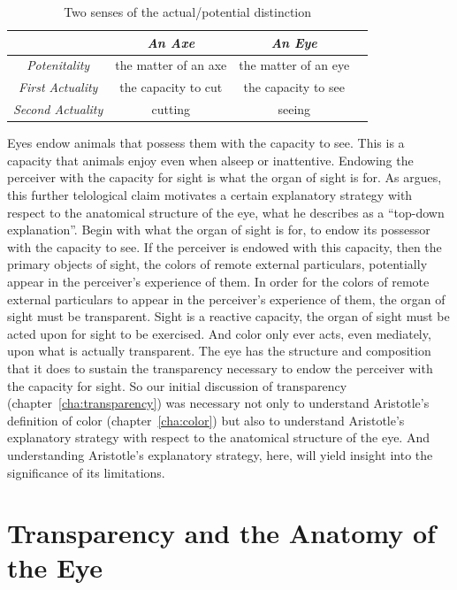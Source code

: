 \begin{table}[htbp]
	\centering
		\begin{tabular}{cccc}
			& \emph{An Axe} & \emph{An Eye}\\
			\hline
			\emph{Potenitality} & the matter of an axe & the matter of an eye\\
			\hline
			\emph{First Actuality} & the capacity to cut & the capacity to see\\
			\hline
			\emph{Second Actuality} & cutting & seeing\\
			\hline
		\end{tabular}
	\caption{Two senses of the actual/potential distinction}
	\label{tab:potential}
\end{table}

Eyes endow animals that possess them with the capacity to see. This is a capacity that animals enjoy even when alseep or inattentive. Endowing the perceiver with the capacity for sight is what the organ of sight is for. As \citet{Johansen:1997zr} argues, this further telological claim motivates a certain explanatory strategy with respect to the anatomical structure of the eye, what he describes as a ``top-down explanation''. Begin with what the organ of sight is for, to endow its possessor with the capacity to see. If the perceiver is endowed with this capacity, then the primary objects of sight, the colors of remote external particulars, potentially appear in the perceiver's experience of them. In order for the colors of remote external particulars to appear in the perceiver's experience of them, the organ of sight must be transparent. Sight is a reactive capacity, the organ of sight must be acted upon for sight to be exercised. And color only ever acts, even mediately, upon what is actually transparent. The eye has the structure and composition that it does to sustain the transparency necessary to endow the perceiver with the capacity for sight. So our initial discussion of transparency (chapter~\ref{cha:transparency}) was necessary not only to understand Aristotle's definition of color (chapter~\ref{cha:color}) but also to understand Aristotle's explanatory strategy with respect to the anatomical structure of the eye. And understanding Aristotle's explanatory strategy, here, will yield insight into the significance of its limitations.




\section{Transparency and the Anatomy of the Eye} %
\label{sec:transparency_and_the_anatomy_of_the_eye}

